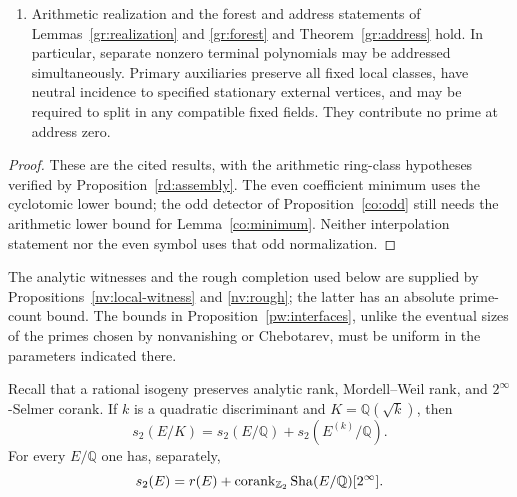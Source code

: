 \begin{proposition}
\begin{enumerate}
\begin{equation}
\end{equation}
an odd unit gives analytic order one and
\begin{equation}\label{pw:odd-unit-interface}
 j(P_h)\le w(h)+C.
\end{equation}
The constants are independent of the number and sizes of the variable
primes.  The fixed genus partner used to define $P_h$ is denoted $h_*$.
\item Arithmetic realization and the forest and address statements of
Lemmas~\ref{gr:realization} and \ref{gr:forest} and
Theorem~\ref{gr:address} hold.
In particular, separate nonzero terminal polynomials may be addressed
simultaneously.  Primary auxiliaries preserve all fixed local classes,
have neutral incidence to specified stationary external vertices, and may
be required to split in any compatible fixed fields.  They contribute no
prime at address zero.
\end{enumerate}
\end{proposition}

\begin{proof}
These are the cited results, with the arithmetic ring-class hypotheses
verified by Proposition~\ref{rd:assembly}.  The even coefficient minimum
uses the cyclotomic lower bound; the odd detector of
Proposition~\ref{co:odd} still needs the arithmetic lower bound for
Lemma~\ref{co:minimum}.  Neither interpolation statement nor the even
symbol uses that odd normalization.
\end{proof}

The analytic witnesses and the rough completion used below are supplied by
Propositions~\ref{nv:local-witness} and \ref{nv:rough}; the latter has an absolute
prime-count bound.  The bounds in Proposition~\ref{pw:interfaces}, unlike the
eventual sizes of the primes chosen by nonvanishing or Chebotarev, must be
uniform in the parameters indicated there.

\begin{lemma}\label{pw:isogeny-corank}
Recall that a rational isogeny preserves analytic rank, Mordell--Weil rank,
and $2^\infty$-Selmer corank.  If $k$ is a quadratic discriminant and
$K=\mathbb Q(\sqrt{k})$, then
\begin{equation}\label{pw:quadratic-corank}
 s_2(E/K)=s_2(E/\mathbb Q)+s_2(E^{(k)}/\mathbb Q).
\end{equation}
For every $E/\mathbb Q$ one has, separately,
\begin{equation}\label{pw:kummer-corank}
 s_2(E)=r(E)+
 \operatorname{corank}_{\mathbb Z_2}\operatorname{Sha}(E/\mathbb Q)[2^\infty].
\end{equation}
\end{lemma}

